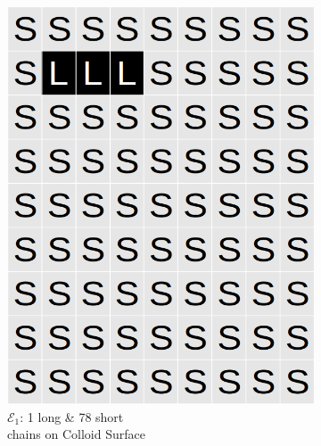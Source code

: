 \documentclass[journal=mamobx,manuscript=article]{achemso}
\begin{document}
\begin{figure}[H]
\begin{subfigure}[b]{0.4\textwidth}
        \includegraphics[scale=0.15]{fig8b.png}
        \caption{$\mathcal{E}_1$: 1 long \& 78 short \\chains on Colloid Surface}
        \label{fig:B}
    \end{subfigure}
    \begin{subfigure}[b]{0.4\textwidth}

\end{subfigure}
\end{figure}
\end{document}
